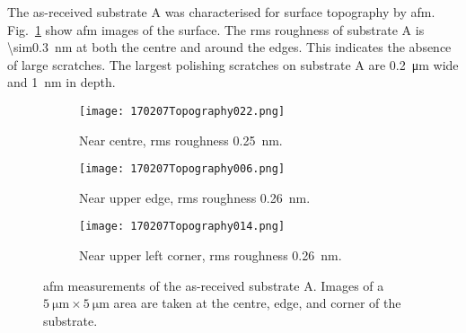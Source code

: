 The as-received substrate A was characterised for surface topography by \ac{afm}. Fig.~\ref{fig:afm_subA} show \ac{afm} images of the surface. The \ac{rms} roughness of substrate A is \SI{\sim0.3}{\nano\metre} at both the centre and around the edges. This indicates the absence of large scratches. The largest polishing scratches on substrate A are \SI{0.2}{\micro\metre} wide and \SI{1}{\nano\metre} in depth.


\begin{figure}[htbp] %
    \centering
    \begin{subfigure}[t]{0.5\linewidth}
        \texttt{[image: 170207Topography022.png]}
        \caption{Near centre, \ac{rms} roughness \SI{0,25}{\nano\metre}.}
    \end{subfigure}
    \par\bigskip
    \begin{subfigure}[t]{0.5\linewidth}
        \texttt{[image: 170207Topography006.png]}
        \caption{Near upper edge, \ac{rms} roughness \SI{0,26}{\nano\metre}.}
    \end{subfigure}
    \par\bigskip
    \begin{subfigure}[t]{0.5\linewidth}
        \texttt{[image: 170207Topography014.png]}
        \caption{Near upper left corner, \ac{rms} roughness \SI{0,26}{\nano\metre}.}
    \end{subfigure}
    \caption[\Ac{afm} of as-received substrate A.]{\Acf{afm} measurements of the as-received substrate A. Images of a $\SI{5}{\micro\metre}\times\SI{5}{\micro\metre}$ area are taken at the centre, edge, and corner of the substrate.}\label{fig:afm_subA}
\end{figure} %




